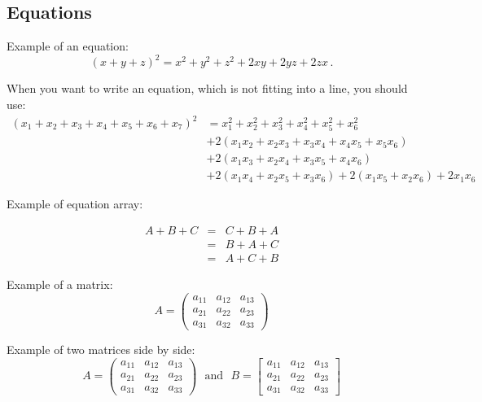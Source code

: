 \documentclass[11pt,a4paper,leqno]{article}
\numberwithin{equation}{subsection}
\theoremstyle{definition}
\begin{document}
\subsection{Equations}
Example of an equation: 
\begin{equation}
	(x+y+z)^2 = x^2+y^2+z^2+2xy+2yz+2zx\,. 
\end{equation}

\noindent
When you want to write an equation, which is not fitting into a line, you should use: 
\begin{align}
(x_1 + x_2 + x_3 + x_4 + x_5 + x_6 + x_7)^2 
& = x_1^2 + x_2^2 + x_3^2 + x_4^2 + x_5^2 + x_6^2 \nonumber \\ 
& + 2(x_1x_2 + x_2x_3 + x_3x_4 + x_4x_5 + x_5x_6) \nonumber \\ 
& + 2(x_1x_3 + x_2x_4 + x_3x_5 + x_4x_6)  \\ 
& + 2(x_1x_4 + x_2x_5 + x_3x_6) + 2(x_1x_5 + x_2x_6) + 2x_1x_6 \nonumber 
\end{align}

\noindent
Example of equation array: 

\begin{eqnarray}
	A + B + C & = & C + B + A \nonumber \\ 
	& = & B + A + C  \\ 
	& = & A + C + B \nonumber
\end{eqnarray}

\noindent
Example of a matrix: 
\begin{equation}
A = \begin{pmatrix}
a_{11} & a_{12} & a_{13} \\ 
a_{21} & a_{22} & a_{23} \\ 
a_{31} & a_{32} & a_{33} 
\end{pmatrix} 
\end{equation}

\noindent
Example of two matrices side by side: 
\begin{equation}
	A = \begin{pmatrix}
	a_{11} & a_{12} & a_{13} \\ 
	a_{21} & a_{22} & a_{23} \\ 
	a_{31} & a_{32} & a_{33} 
	\end{pmatrix} 
	\ \ \ \text{and}\ \ \ 
	B = \begin{bmatrix}
	a_{11} & a_{12} & a_{13} \\ 
	a_{21} & a_{22} & a_{23} \\ 
	a_{31} & a_{32} & a_{33} 
	\end{bmatrix}
\end{equation}
\end{document}
